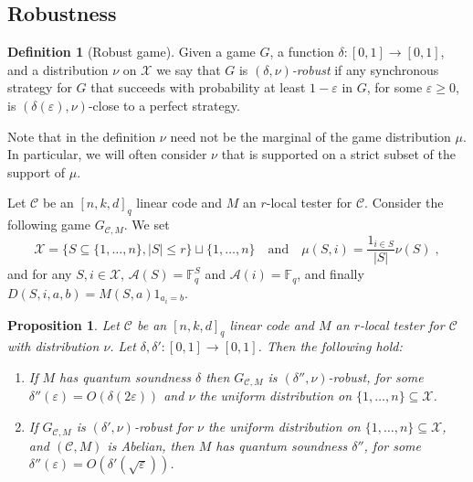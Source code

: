 \documentclass[11pt]{article}
\newtheorem{proposition}[theorem]{Proposition}
\theoremstyle{definition}
\newtheorem{definition}[theorem]{Definition}
\newcommand{\code}{\mathcal{C}}
\newcommand{\F}{\ensuremath{\mathbb{F}}}
\newcommand{\mA}{\ensuremath{\mathcal{A}}}
\newcommand{\mC}{\ensuremath{\mathcal{C}}}
\newcommand{\mX}{\ensuremath{\mathcal{X}}}
\newcommand{\eps}{\varepsilon}
\begin{document}
\subsection{Robustness}


\begin{definition}[Robust game]
Given a game $G$, a function $\delta:[0,1]\to[0,1]$, and a distribution $\nu$ on $\mX$ we say that $G$ is \emph{$(\delta,\nu)$-robust} if any synchronous strategy for $G$ that succeeds with probability at least $1-\eps$ in $G$, for some $\eps\geq 0$, is
 $(\delta(\eps),\nu)$-close to a perfect strategy.
\end{definition}

Note that in the definition $\nu$ need not be the marginal of the game distribution $\mu$. In particular, we will often consider $\nu$ that is supported on a strict subset of the support of $\mu$. 

Let $\code$ be an $[n,k,d]_q$ linear code and $M$ an $r$-local tester for $\code$. Consider the following game $G_{\code,M}$. We set 
\[\mX = \{ S\subseteq \{1,\ldots,n\},|S|\leq r\} \sqcup\{1,\ldots,n\}\quad\text{and}\quad \mu(S,i)=\frac{1_{i\in S}}{|S|}\nu(S)\;,\]
and for any $S,i\in\mX$, $\mA(S)=\F_q^S$ and $\mA(i)=\F_q$, and finally $D(S,i,a,b)=M(S,a)1_{a_i=b}$. 



\begin{proposition}\label{prop:sound-game}
Let $\code$ be an $[n,k,d]_q$ linear code and $M$ an $r$-local tester for $\code$ with distribution $\nu$. Let $\delta,\delta':[0,1]\to[0,1]$. Then the following hold:
\begin{enumerate}
\item If $M$ has quantum soundness $\delta$ then $G_{\code,M}$ is $(\delta'',\nu)$-robust, for some $\delta''(\eps)=O({\delta(2\eps)})$ and $\nu$ the uniform distribution on $\{1,\ldots,n\}\subseteq \mX$. 
\item If $G_{\code,M}$ is $(\delta',\nu)$-robust for $\nu$ the uniform distribution on $\{1,\ldots,n\}\subseteq \mX$, and $(\mC,M)$ is Abelian, then $M$ has quantum soundness $\delta''$, for some $\delta''(\eps) = O(\delta'(\sqrt{\eps}))$. 
\end{enumerate}
\end{proposition}
\end{document}
